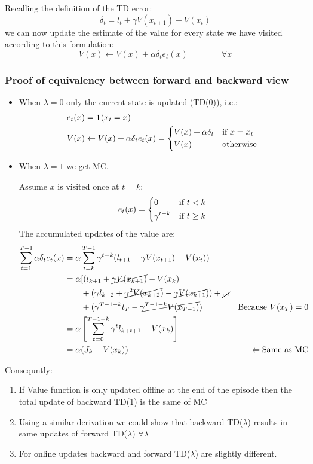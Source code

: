 Recalling the definition of the TD error:
\[\delta_t = l_t + \gamma V(x_{t+1}) - V(x_t)\]
we can now update the estimate of the value for every state we have visited according to this formulation:
\[V(x)\leftarrow V(x) + \alpha\delta_t e_t(x)\qquad\qquad\forall x\]

\subsubsection{Proof of equivalency between forward and backward view}
\begin{itemize}
\item When $\lambda = 0$ only the current state is updated (TD(0)), i.e.:
\begin{align*}
e_t(x) &= \mathbf{1}(x_t=x)\\
V(x) &\leftarrow V(x) + \alpha\delta_t e_t(x) = 
\begin{dcases}
V(x) + \alpha\delta_t &\text{if }x=x_t\\
V(x) &\text{otherwise}
\end{dcases}
\end{align*}
\item When $\lambda = 1$ we get MC. 

Assume $x$ is visited once at $t = k$:
\[e_t(x) = 
\begin{dcases}
0&\text{if }t<k\\
\gamma^{t-k}&\text{if }t\ge k
\end{dcases}\]
The accumulated updates of the value are:
\begin{align*}
\sum_{t=1}^{T-1} \alpha\delta_t e_t(x) &= \alpha \sum_{t=k}^{T-1} \gamma^{t-k} (l_{t+1} + \gamma V(x_{t+1}) - V(x_t))&\\
&= \alpha [( l_{k+1} + \cancel{\gamma V(x_{k+1})} - V(x_k) \\
&\qquad+ (\gamma l_{k+2} + \cancel{\gamma^2 V(x_{k+2})} - \cancel{\gamma V(x_{k+1})}) + \cancel{...} \\
&\qquad+ (\gamma^{T-1-k}l_T-\cancel{\gamma^{T-1-k}V(x_{T-1})})& \text{Because }V(x_T) = 0\\
&= \alpha \left[ \sum_{t=0}^{T-1-k} \gamma^t l_{k+t+1} - V(x_k)\right]&\\
&=\alpha(J_k - V(x_k))&\Leftarrow \text{Same as MC}
\end{align*}
\end{itemize}
Consequntly:
\begin{enumerate}
\item If Value function is only updated offline at the end of the episode then the total update of backward TD(1) is the same of MC
\item Using a similar derivation we could show that backward TD($\lambda$) results in same updates of forward TD($\lambda$) $\forall \lambda$
\item For online updates backward and forward TD($\lambda$) are slightly different.
\end{enumerate}


